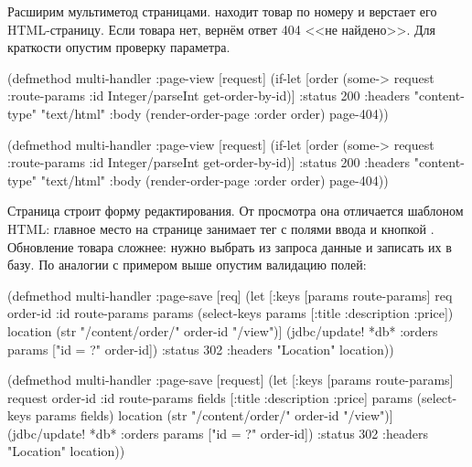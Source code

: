 
Расширим мультиметод страницами.  находит товар по
номеру и верстает его HTML-страницу. Если товара нет, вернём ответ 404 <<не
найдено>>. Для краткости опустим проверку параметра.

\ifnarrow

\begin{clojure}
(defmethod multi-handler :page-view
  [request]
  (if-let [order (some->
                   request
                   :route-params
                   :id
                   Integer/parseInt
                   get-order-by-id)]
    {:status 200
     :headers {"content-type"
               "text/html"}
     :body (render-order-page
             {:order order})}
    page-404))
\end{clojure}

\else

\begin{clojure}
(defmethod multi-handler :page-view
  [request]
  (if-let [order (some-> request
                         :route-params
                         :id
                         Integer/parseInt
                         get-order-by-id)]
    {:status 200
     :headers {"content-type" "text/html"}
     :body (render-order-page {:order order})}
    page-404))
\end{clojure}

\fi

Страница  строит форму редактирования. От просмотра она
отличается шаблоном HTML: главное место на странице занимает тег  с
полями ввода и кнопкой . Обновление товара сложнее: нужно выбрать
из запроса данные и записать их в базу. По аналогии с примером выше опустим
валидацию полей:

\ifnarrow

\begin{clojure}
(defmethod multi-handler :page-save
  [req]
  (let [{:keys [params route-params]} req
        {order-id :id} route-params
        params (select-keys params
                 [:title :description
                  :price])
        location (str "/content/order/"
                   order-id "/view")]
    (jdbc/update! *db* :orders
      params ["id = ?" order-id])
    {:status 302
     :headers {"Location" location}}))
\end{clojure}

\else

\begin{clojure}
(defmethod multi-handler :page-save
  [request]
  (let [{:keys [params route-params]} request
        {order-id :id} route-params
        fields [:title :description :price]
        params (select-keys params fields)
        location (str "/content/order/" order-id "/view")]
    (jdbc/update! *db* :orders params ["id = ?" order-id])
    {:status 302
     :headers {"Location" location}}))
\end{clojure}

